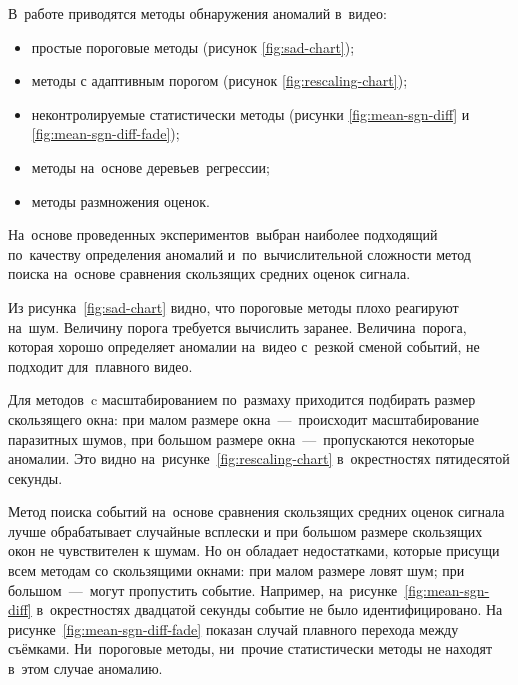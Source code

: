 \documentclass{.local/lib/classes/ndvr-super-article-standalone}
\begin{document}
    \noindent
    В~работе приводятся методы 
    обнаружения аномалий в~видео: 
    \begin{itemize}
        \item {
            простые пороговые методы 
            (рисунок \ref{fig:sad-chart});
        }
        \item {
            методы с адаптивным порогом 
            (рисунок \ref{fig:rescaling-chart});
        }
        \item {
            неконтролируемые статистически методы 
            (рисунки \ref{fig:mean-sgn-diff} 
            и \ref{fig:mean-sgn-diff-fade});
        }
        \item {
            методы на~основе деревьев~регрессии;
        }
        \item {
            методы размножения оценок.
        }
    \end{itemize}

    На~основе проведенных экспериментов~выбран 
    наиболее подходящий по~качеству определения аномалий 
    и~по~вычислительной сложности метод
    поиска на~основе сравнения скользящих 
    средних оценок сигнала.

    Из рисунка~\ref{fig:sad-chart} видно,
    что пороговые методы плохо реагируют на~шум.
    Величину порога требуется вычислить заранее. 
    Величина~порога, которая хорошо определяет аномалии на~видео 
    с~резкой сменой событий, не подходит для~плавного видео. 

    Для методов~c масштабированием по~размаху  
    приходится подбирать размер скользящего окна: 
    при малом размере окна~—~происходит 
    масштабирование паразитных шумов, 
    при большом размере окна~—~пропускаются некоторые аномалии.
    Это видно на~рисунке~\ref{fig:rescaling-chart}
    в~окрестностях пятидесятой секунды.


    Метод поиска событий на~основе 
    сравнения скользящих средних оценок сигнала
    лучше обрабатывает случайные всплески
    и при большом размере скользящих окон не чувствителен
    к шумам.
    Но он обладает недостатками, которые присущи всем
    методам со скользящими окнами: при малом размере ловят шум; 
    при большом~—~могут пропустить событие. 
    Например, на~рисунке~\ref{fig:mean-sgn-diff}
    в~окрестностях двадцатой секунды 
    событие не было идентифицировано.
    На рисунке~\ref{fig:mean-sgn-diff-fade}
    показан случай плавного перехода между съёмками.
    Ни~пороговые методы, ни~прочие статистически методы 
    не находят в~этом случае аномалию.
\end{document}
